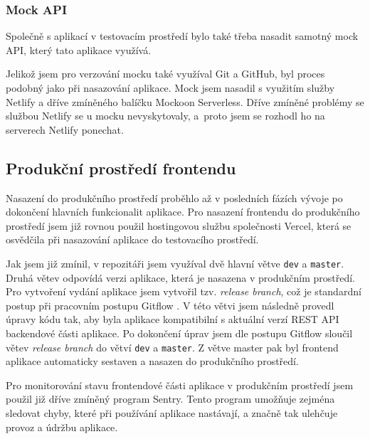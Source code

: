\subsubsection{Mock API}

Společně s aplikací v testovacím prostředí bylo také třeba nasadit samotný mock API, který tato aplikace využívá.

Jelikož jsem pro verzování mocku také využíval Git a GitHub, byl proces podobný jako při nasazování aplikace. Mock jsem nasadil s využitím služby Netlify a dříve zmíněného balíčku Mockoon Serverless. Dříve zmíněné problémy se službou Netlify se u mocku nevyskytovaly, a~proto jsem se rozhodl ho na serverech Netlify ponechat.

\subsection{Produkční prostředí frontendu}

Nasazení do produkčního prostředí proběhlo až v posledních fázích vývoje po dokončení hlavních funkcionalit aplikace. Pro nasazení frontendu do produkčního prostředí jsem již rovnou použil hostingovou službu společnosti Vercel, která se osvědčila při nasazování aplikace do testovacího prostředí.

Jak jsem již zmínil, v repozitáři jsem využíval dvě hlavní větve \texttt{dev} a \texttt{master}. Druhá větev odpovídá verzi aplikace, která je nasazena v produkčním prostředí. Pro vytvoření vydání aplikace jsem vytvořil tzv. \textit{release branch}, což je standardní postup při pracovním postupu Gitflow \cite{Gitflow}. V této větvi jsem následně provedl úpravy kódu tak, aby byla aplikace kompatibilní s aktuální verzí REST API backendové části aplikace. Po dokončení úprav jsem dle postupu Gitflow sloučil větev \textit{release branch} do větví \texttt{dev} a \texttt{master}. Z větve master pak byl frontend aplikace automaticky sestaven a nasazen do produkčního prostředí.

Pro monitorování stavu frontendové části aplikace v produkčním prostředí jsem použil již dříve zmíněný program Sentry. Tento program umožňuje zejména sledovat chyby, které při používání aplikace nastávají, a značně tak ulehčuje provoz a údržbu aplikace.
